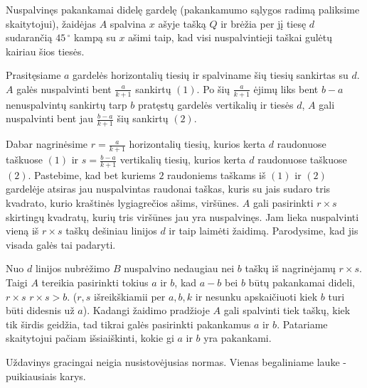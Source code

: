 \begin{enumerate}
Nuspalvinęs pakankamai didelę gardelę (pakankamumo sąlygos radimą
paliksime skaitytojui), žaidėjas $A$ spalvina $x$ ašyje tašką $Q$ ir brėžia per
jį tiesę $d$ sudarančią $45\,^{\circ}$  kampą su $x$ ašimi taip, kad visi
nuspalvintieji taškai gulėtų kairiau šios tiesės.

Prasitęsiame $a$ gardelės horizontalių tiesių ir spalviname šių tiesių
sankirtas su $d$. $A$ galės nuspalvinti bent $ \frac{a}{k+1} $ sankirtų
$(1)$.  Po šių  $ \frac{a}{k+1} $ ėjimų liks bent $b-a$ nenuspalvintų
sankirtų tarp $b$ pratęstų gardelės vertikalių  ir tiesės $d$, $A$ gali
nuspalvinti bent jau $ \frac{b-a}{k+1} $ šių sankirtų $(2)$. 

Dabar nagrinėsime $r= \frac{a}{k+1} $ horizontalių tiesių, kurios kerta
$d$ raudonuose taškuose $(1)$ ir $s= \frac{b-a}{k+1} $ vertikalių tiesių,
kurios kerta $d$ raudonuose taškuose $(2)$. Pastebime, kad bet kuriems $2$
raudoniems taškams iš $(1)$ ir $(2)$ gardelėje atsiras jau nuspalvintas
raudonai taškas, kuris su jais sudaro tris kvadrato, kurio kraštinės
lygiagrečios ašims, viršūnes. $A$ gali pasirinkti  $ r\times s $ skirtingų
kvadratų, kurių tris viršūnes jau yra nuspalvinęs. Jam lieka nuspalvinti
vieną iš  $  r\times s $ taškų dešiniau linijos $d$ ir taip laimėti
žaidimą. Parodysime, kad jis visada galės tai padaryti.

Nuo $d$ linijos nubrėžimo $B$ nuspalvino nedaugiau nei $b$ taškų iš
nagrinėjamų $ r\times s $. Taigi $A$ tereikia pasirinkti tokius $a$ ir
$b$, kad $a-b$ bei $b$ būtų pakankamai dideli, $ r\times s $ $r\times s >
b$. ($r,s$ išreikškiamii per $a,b,k$ ir nesunku apskaičiuoti kiek $b$ turi
būti didesnis už $a$). Kadangi žaidimo pradžioje $A$ gali spalvinti tiek
taškų, kiek tik širdis geidžia, tad tikrai galės pasirinkti pakankamus $a$
ir $b$. Patariame skaitytojui pačiam išsiaiškinti, kokie gi $a$ ir $b$ yra
pakankami.

Uždavinys gracingai neigia nusistovėjusias normas. Vienas begaliniame
lauke - puikiausiais karys.
\end{enumerate} 
